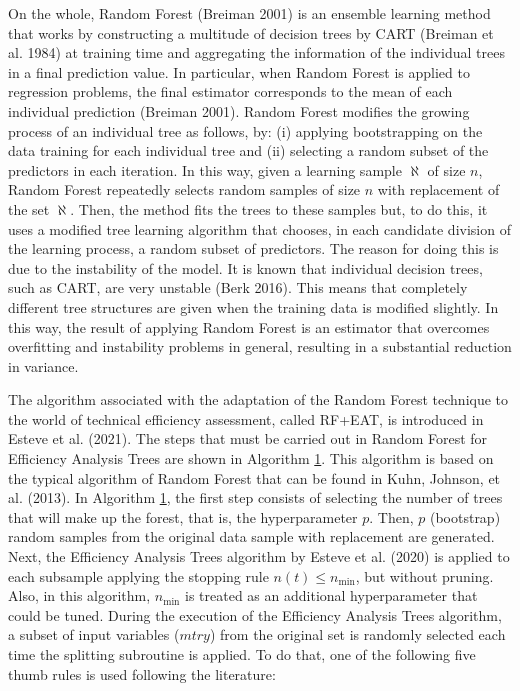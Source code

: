 On the whole, Random Forest (Breiman 2001) is an ensemble learning method that works by constructing a multitude of decision trees by CART (Breiman et al. 1984) at training time and aggregating the information of the individual trees in a final prediction value. In particular, when Random Forest is applied to regression problems, the final estimator corresponds to the mean of each individual prediction (Breiman 2001). Random Forest modifies the growing process of an individual tree as follows, by: (i) applying bootstrapping on the data training for each individual tree and (ii) selecting a random subset of the predictors in each iteration. In this way, given a learning sample \(\aleph\) of size \(n\), Random Forest repeatedly selects random samples of size \(n\) with replacement of the set \(\aleph\). Then, the method fits the trees to these samples but, to do this, it uses a modified tree learning algorithm that chooses, in each candidate division of the learning process, a random subset of predictors. The reason for doing this is due to the instability of the model. It is known that individual decision trees, such as CART, are very unstable (Berk 2016). This means that completely different tree structures are given when the training data is modified slightly. In this way, the result of applying Random Forest is an estimator that overcomes overfitting and instability problems in general, resulting in a substantial reduction in variance.

The algorithm associated with the adaptation of the Random Forest technique to the world of technical efficiency assessment, called RF+EAT, is introduced in Esteve et al. (2021). The steps that must be carried out in Random Forest for Efficiency Analysis Trees are shown in Algorithm \hyperref[alg:algo1]{1}. This algorithm is based on the typical algorithm of Random Forest that can be found in Kuhn, Johnson, et al. (2013). In Algorithm \hyperref[alg:algo1]{1}, the first step consists of selecting the number of trees that will make up the forest, that is, the hyperparameter \(p\). Then, \(p\) (bootstrap) random samples from the original data sample with replacement are generated. Next, the Efficiency Analysis Trees algorithm by Esteve et al. (2020) is applied to each subsample applying the stopping rule \(n\left(t\right)\le n_{\min}\), but without pruning. Also, in this algorithm, \(n_{\min}\) is treated as an additional hyperparameter that could be tuned. During the execution of the Efficiency Analysis Trees algorithm, a subset of input variables (\(mtry\)) from the original set is randomly selected each time the splitting subroutine is applied. To do that, one of the following five thumb rules is used following the literature:


